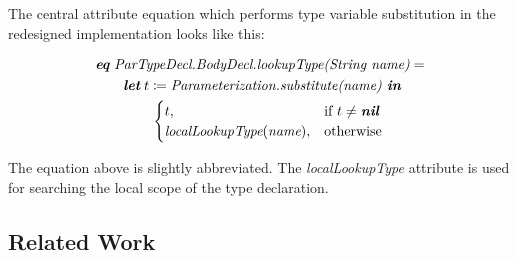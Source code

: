 \documentclass[10pt, twoside, openright]{book}
\begin{document}
The central attribute equation which performs type variable substitution in the redesigned
implementation looks like this:



\begin{align*}
& \textbf{\textit{eq}} \; \textit{ParTypeDecl.BodyDecl.lookupType(String name)} = \\
& \qquad  \textit{\textbf{let}} \; t \coloneqq \textit{Parameterization.substitute(name) \textbf{in}} \\
& \qquad\qquad \begin{cases}
  t, & \text{if $t \ne \textit{\textbf{nil}}$} \\
  \textit{localLookupType}(\textit{name}), & \text{otherwise}
\end{cases}
\end{align*}

\noindent
The equation above is slightly abbreviated. The \emph{localLookupType}
attribute is used for searching the local scope of the type declaration.

%
%
%
%
%

\subsection{Related Work}
\end{document}
